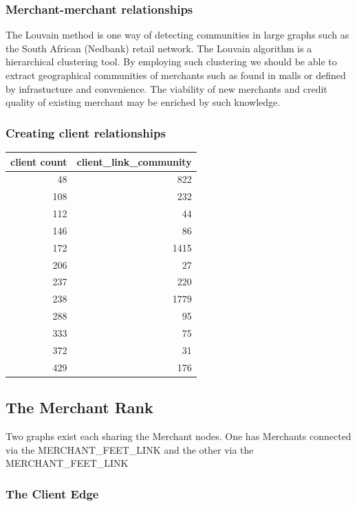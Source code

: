 \subsubsection{Merchant-merchant relationships}


The Louvain method is one way of detecting communities in large graphs such as the South African (Nedbank) retail network.  The Louvain algorithm is a hierarchical clustering tool.  By employing such clustering we should be able to extract geographical communities of merchants such as found in malls or defined by infrastucture and convenience. The viability of new merchants and credit quality of existing merchant may be enriched by such knowledge.

\subsubsection{Creating client relationships}

\begin{center}
\begin{tabular}{rr}
\toprule
 client count &  client\_link\_community \\
\midrule
    48 &                    822 \\
   108 &                    232 \\
   112 &                     44 \\
   146 &                     86 \\
   172 &                   1415 \\
   206 &                     27 \\
   237 &                    220 \\
   238 &                   1779 \\
   288 &                     95 \\
   333 &                     75 \\
   372 &                     31 \\
   429 &                    176 \\
\bottomrule
\end{tabular}
\end{center}




\subsection{The Merchant Rank}

Two graphs exist each sharing the Merchant nodes.  One has Merchants connected via the MERCHANT\_FEET\_LINK and the other via the MERCHANT\_FEET\_LINK

\subsubsection{The Client Edge}


